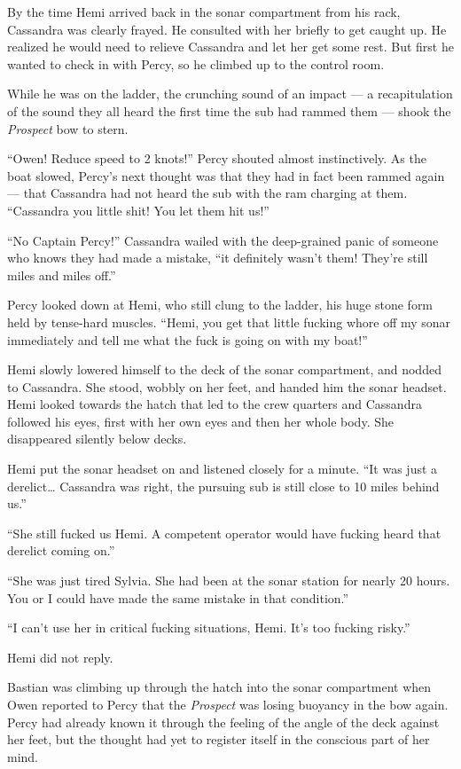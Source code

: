 \documentclass[]{scrbook}
\begin{document}
By the time Hemi arrived back in the sonar compartment from his rack,
Cassandra was clearly frayed. He consulted with her briefly to get
caught up. He realized he would need to relieve Cassandra and let her
get some rest. But first he wanted to check in with Percy, so he climbed
up to the control room.

While he was on the ladder, the crunching sound of an impact --- a
recapitulation of the sound they all heard the first time the sub had
rammed them --- shook the \emph{Prospect} bow to stern.

``Owen! Reduce speed to 2 knots!'' Percy shouted almost instinctively.
As the boat slowed, Percy's next thought was that they had in fact been
rammed again --- that Cassandra had not heard the sub with the ram
charging at them. ``Cassandra you little shit! You let them hit us!''

``No Captain Percy!'' Cassandra wailed with the deep-grained panic of
someone who knows they had made a mistake, ``it definitely wasn't them!
They're still miles and miles off.''

Percy looked down at Hemi, who still clung to the ladder, his huge stone
form held by tense-hard muscles. ``Hemi, you get that little fucking
whore off my sonar immediately and tell me what the fuck is going on
with my boat!''

Hemi slowly lowered himself to the deck of the sonar compartment, and
nodded to Cassandra. She stood, wobbly on her feet, and handed him the
sonar headset. Hemi looked towards the hatch that led to the crew
quarters and Cassandra followed his eyes, first with her own eyes and
then her whole body. She disappeared silently below decks.

Hemi put the sonar headset on and listened closely for a minute. ``It
was just a derelict\ldots{} Cassandra was right, the pursuing sub is
still close to 10 miles behind us.''

``She still fucked us Hemi. A competent operator would have fucking
heard that derelict coming on.''

``She was just tired Sylvia. She had been at the sonar station for
nearly 20 hours. You or I could have made the same mistake in that
condition.''

``I can't use her in critical fucking situations, Hemi. It's too fucking
risky.''

Hemi did not reply.

Bastian was climbing up through the hatch into the sonar compartment
when Owen reported to Percy that the \emph{Prospect} was losing buoyancy
in the bow again. Percy had already known it through the feeling of the
angle of the deck against her feet, but the thought had yet to register
itself in the conscious part of her mind.
\end{document}
